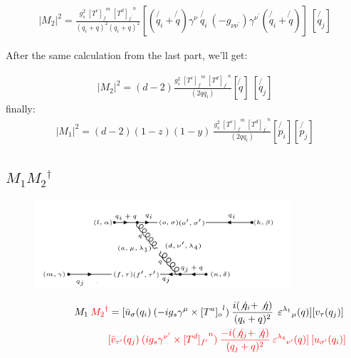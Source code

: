 \begin{equation}
\begin{split}
|M_2|^2 =\frac{g_s^2 \: {[T^c]_f}^m \: {[T^d]_{f^{\prime}}}^n }{(q_i + q)^2 (q_i + q)^2} [(\not{q_i} + \not{q}) \gamma^{\nu}  \:\not{q_i}\: (-g_{{\nu}{{\nu}^{\prime}}}) \gamma^{{\nu}^{\prime}}(\not{q_i} + \not{q})]\: 
[\not{q_j} ]
\end{split}
\end{equation}

After the same calculation from the last part, we'll get:

\begin{equation}
\begin{split}
|M_2|^2 =(d-2) \frac{g_s^2 \: {[T^c]_f}^m \: {[T^d]_{f^{\prime}}}^n }{(2qq_i)} [\not{q}]\: 
[\not{q_j} ]
\end{split}
\end{equation}
finally:
\begin{equation}
\begin{split}
|M_1|^2=(d-2)(1-z)(1-y)\:\frac{g_s^2 \: {[T^c]_f}^m \: {[T^d]_{f^{\prime}}}^n }{(2qq_i)}
[\not{p_i}][\not{p_j}]
\end{split}
\end{equation}
\newpage



\newpage

\subsection{$M_1 {M_2}^{\dagger}$}

\begin{figure}[h!]
\centering
\includegraphics[width=0.85\textwidth]{images/M1M2Degaqqg.png}
\end{figure}

\begin{equation}
\begin{split}
M_1\:{\color[RGB]{255,0,0} {M_2}^{\dagger}} = [{\bar{u}}_{\sigma}(q_i)\: (-ig_s \gamma^{\mu}\times {[T^a]_o}^l) \: \frac{i(\not{q_i} + \not{q})}{(q_i + q)^2}\:\: {\varepsilon^{\lambda_1}}_{\mu} (q)] [{v}_{\tau}(q_j)]\: \\
\quad\quad\quad\quad\quad\quad\quad\quad\:\:{\color[RGB]{255,0,0}[\bar{v}_{{\tau}^{\prime}}(q_j) \: (ig_s \gamma^{{\nu}^{\prime}}\times {[T^d]_{f^{\prime}}}^n) \: \frac{-i(\not{q_j} + \not{q})}{(q_j + q)^2} \: {\varepsilon^{\lambda_4}}_{{\nu}^{\prime}} (q)]\: [{u}_{{\sigma}^{\prime}}(q_i)]}
\end{split}
\end{equation}



